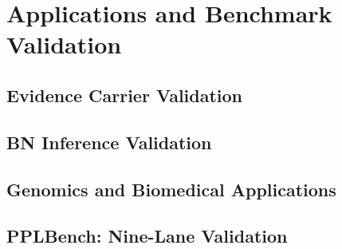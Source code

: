 \documentclass[11pt,openany]{report}
\begin{document}









\part{Applications and Benchmark Validation}
\label{part:applications}

\chapter{Evidence Carrier Validation}
\label{ch:carrier-validation}



\chapter{BN Inference Validation}
\label{ch:bn-validation}



\chapter{Genomics and Biomedical Applications}
\label{ch:bio}



\chapter{PPLBench: Nine-Lane Validation}
\label{ch:pplbench}

\end{document}
